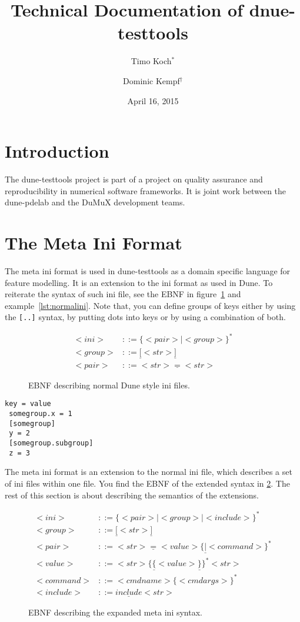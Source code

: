 \documentclass[11pt]{article}
\title{Technical Documentation of \textbf{dnue-testtools}}
\author{
Timo Koch$^\ast$ \and
Dominic Kempf$^\dagger$
}
\date{April 16, 2015}
\begin{document}
\maketitle
\tableofcontents
\pagebreak

\section{Introduction}

The dune-testtools project is part of a project on quality assurance and reproducibility in numerical software frameworks. It is joint work between the dune-pdelab and the DuMuX development teams.

\section{The Meta Ini Format}

The meta ini format is used in dune-testtools as a domain specific language for feature modelling. It is an extension to the ini format as used in Dune. To reiterate the syntax of such ini file, see the EBNF in figure~\ref{fig:normalebnf} and example~\ref{lst:normalini}. Note that, you can define groups of keys either by using the \lstinline![..]! syntax, by putting dots into keys or by using a combination of both.

\begin{figure}
\begin{align*}
 <ini> & ::= \{<pair> | <group>\}^* \\
 <group> & ::= \underline{[}<str>\underline{]} \\
 <pair> & ::= <str>\underline{ = }<str>
\end{align*}
\caption{EBNF describing normal Dune style ini files.}
\label{fig:normalebnf}
\end{figure}

\begin{lstlisting}[caption={A normal DUNE-style ini file},label=lst:normalini]
 key = value
 somegroup.x = 1
 [somegroup]
 y = 2
 [somegroup.subgroup]
 z = 3
\end{lstlisting}

The meta ini format is an extension to the normal ini file, which describes a set of ini files within one file. You find the EBNF of the extended syntax in \ref{fig:metaebnf}. The rest of this section is about describing the semantics of the extensions.

\begin{figure}
\begin{align*}
 <ini> & ::= \{<pair> | <group> | <include> \}^* \\
 <group> & ::= \underline{[}<str>\underline{]} \\
 <pair> & ::= <str>\underline{ = }<value>\{\underline{|} <command>\}^* \\
 <value> & ::= <str>\{\underline{\{}<value>\underline{\}}\}^*<str> \\
 <command> & ::= <cmdname> \{<cmdargs>\}^* \\
 <include> & ::= \underline{include} <str>
\end{align*}
\caption{EBNF describing the expanded meta ini syntax.}
\label{fig:metaebnf}
\end{figure}
\end{document}

